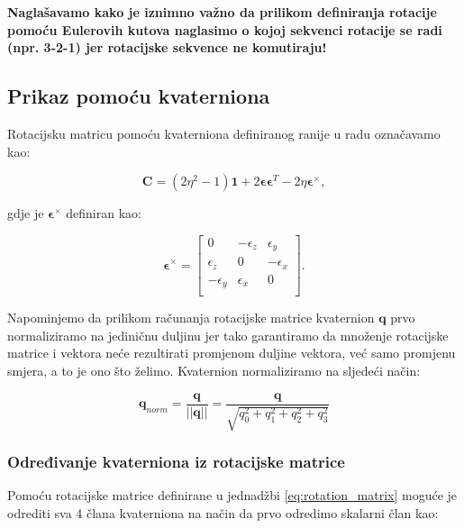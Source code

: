 \documentclass[times, utf8, diplomski, numeric]{templates/template}
\begin{document}
{{{            \textbf{Naglašavamo kako je iznimno važno da prilikom definiranja rotacije pomoću Eulerovih kutova naglasimo o kojoj sekvenci rotacije se radi (npr. 3-2-1) jer rotacijske sekvence ne komutiraju!}
        }

        \subsection{Prikaz pomoću kvaterniona}{
            Rotacijsku matricu pomoću kvaterniona definiranog ranije u radu označavamo kao:

            \begin{equation}
                \textbf{C} = (2\eta^2-1)\textbf{1} + 2\boldsymbol\epsilon\boldsymbol\epsilon^{T}-2\eta\boldsymbol\epsilon^{\times},
            \end{equation}

            gdje je $\boldsymbol\epsilon^{\times}$ definiran kao:

            \begin{equation}
                \boldsymbol\epsilon^{\times} =
                \begin{bmatrix}
                    0 & -\epsilon_{z} & \epsilon_{y} \\
                    \epsilon_{z} & 0 & -\epsilon_{x} \\
                    -\epsilon_{y} & \epsilon_{x} & 0 \\
                \end{bmatrix}
                .
            \end{equation}

            Napominjemo da prilikom računanja rotacijske matrice kvaternion $\textbf{q}$ prvo normaliziramo na jediničnu duljinu jer tako garantiramo da množenje rotacijske matrice i vektora neće rezultirati promjenom duljine vektora, već samo promjenu smjera, a to je ono što želimo. Kvaternion normaliziramo na sljedeći način:

            \begin{equation}
                \textbf{q}_{norm} = \frac{\textbf{q}}{||\textbf{q}||} = \frac{\textbf{q}}{\sqrt{q_0^2 + q_1^2 + q_2^2 + q_3^2}}
            \end{equation}

            \subsubsection{Određivanje kvaterniona iz rotacijske matrice}{
                Pomoću rotacijske matrice definirane u jednadžbi \ref{eq:rotation_matrix} moguće je odrediti sva 4 člana kvaterniona na način da prvo odredimo skalarni član kao:

}}}}
\end{document}
